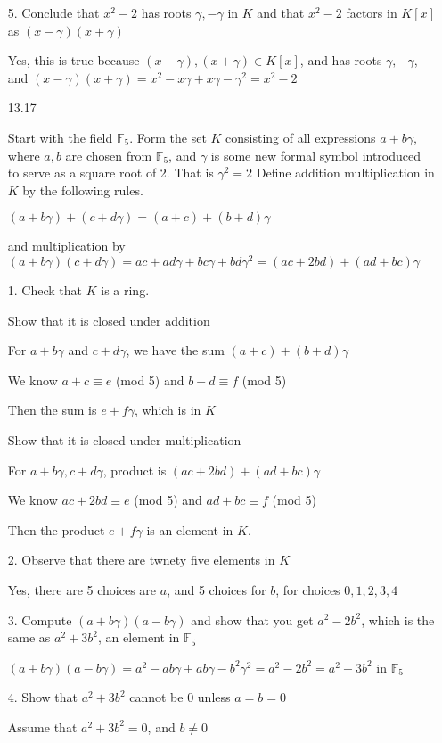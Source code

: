 \documentclass[12pt]{article}
\begin{document}
\begin{itemize}
	5. Conclude that $x^2 - 2$ has roots $\gamma, -\gamma$ in $K$ and that $x^2 - 2$ factors in $K[x]$ as $(x-\gamma)(x+\gamma)$

	Yes, this is true because $(x-\gamma),(x+\gamma) \in K[x]$, and has roots $\gamma, -\gamma$, and $(x-\gamma)(x+\gamma) = x^2 - x\gamma + x\gamma - \gamma^2 = x^2 - 2$

\newpage
\item[13.17]

	Start with the field $\mathbb{F}_5$. Form the set $K$ consisting of all expressions $a+b\gamma$, where $a,b$ are chosen from $\mathbb{F}_5$, and $\gamma$ is some new formal symbol introduced to serve as a square root of 2. That is $\gamma^2 = 2$ Define addition multiplication in $K$ by the following rules.

$(a+b\gamma) + (c+d\gamma) = (a+c) + (b+d)\gamma$

	and multiplication by $(a+b\gamma)(c+d\gamma) = ac + ad\gamma + bc\gamma + bd\gamma^2 = (ac + 2bd) + (ad + bc)\gamma$

	1. Check that $K$ is a ring. 

	Show that it is closed under addition

	For $a + b\gamma$ and $c + d\gamma$, we have the sum $(a+c) + (b+d)\gamma$

	We know $a+c \equiv e$ (mod 5) and $b + d \equiv f$ (mod 5)

	Then the sum is $e + f\gamma$, which is in $K$

	Show that it is closed under multiplication

	For $a+b\gamma, c + d\gamma$, product is $(ac + 2bd) + (ad + bc)\gamma$

	We know $ac + 2bd \equiv e$ (mod 5) and $ad + bc \equiv f$ (mod 5)

	Then the product $e + f\gamma$ is an element in $K$.

	2. Observe that there are twnety five elements in $K$

	Yes, there are 5 choices are $a$, and 5 choices for $b$, for choices $0,1,2,3,4$

	3. Compute $(a+b\gamma)(a-b\gamma)$ and show that you get $a^2 - 2b^2$, which is the same as $a^2 + 3b^2$, an element in $\mathbb{F}_5$

	$(a+b\gamma)(a-b\gamma) = a^2 -ab\gamma + ab\gamma - b^2 \gamma^2 = a^2 - 2b^2 = a^2 + 3b^2$ in $\mathbb{F}_5$

	4. Show that $a^2 + 3b^2$ cannot be 0 unless $a = b = 0$

	Assume that $a^2 + 3b^2 = 0$, and $b \neq 0$


\end{itemize}
\end{document}
